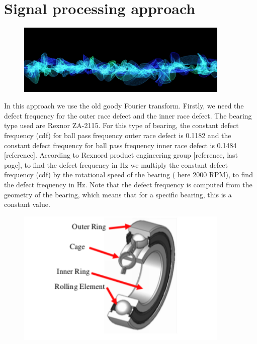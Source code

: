 \documentclass[11pt, oneside]{article}   	%
\begin{document}
\section{Signal processing approach}
\begin{figure}[H] %
   \centering
   \includegraphics[width=4in]{vibration} 
   \caption{}
   \label{fig:example}
\end{figure}
In this approach we use the old goody Fourier transform. Firstly, we need the defect frequency for the outer race defect and the inner race defect. The bearing type used are Rexnor ZA-2115. For this type of bearing, the constant defect frequency (cdf) for ball pass frequency outer race defect is 0.1182 and the constant defect frequency for ball pass frequency inner race defect is 0.1484 [reference]. According to Rexnord product engineering group [reference, last page], to find the defect frequency in Hz we multiply the constant defect frequency (cdf) by the rotational speed of the bearing ( here 2000 RPM), to find the defect frequency in Hz. Note that the defect frequency is computed from the geometry of the bearing, which means that for a specific bearing, this is a constant value.
\begin{figure}[H] %
   \centering
   \includegraphics[width=4in]{bearing.png} 
   \caption{}
   \label{fig:example}
\end{figure}
\end{document}
